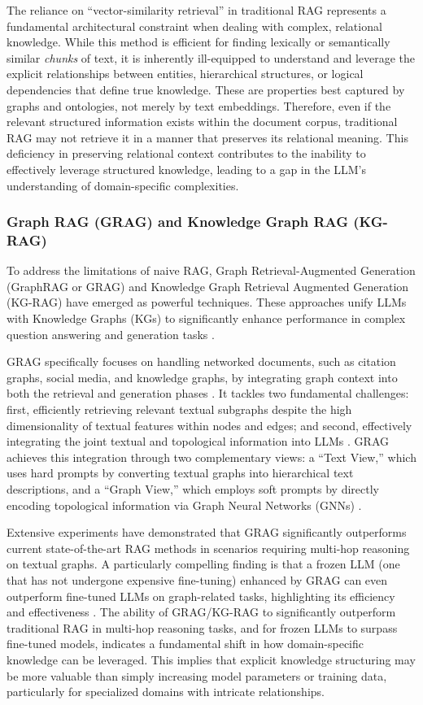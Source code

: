 \documentclass[12pt]{article}
\let\cite\textcite  %
\begin{document}
The reliance on ``vector-similarity retrieval'' in traditional RAG represents a fundamental architectural constraint when dealing with complex, relational knowledge. While this method is efficient for finding lexically or semantically similar \emph{chunks} of text, it is inherently ill-equipped to understand and leverage the explicit relationships between entities, hierarchical structures, or logical dependencies that define true knowledge. These are properties best captured by graphs and ontologies, not merely by text embeddings. Therefore, even if the relevant structured information exists within the document corpus, traditional RAG may not retrieve it in a manner that preserves its relational meaning. This deficiency in preserving relational context contributes to the inability to effectively leverage structured knowledge, leading to a gap in the LLM's understanding of domain-specific complexities.

\subsubsection{Graph RAG (GRAG) and Knowledge Graph RAG (KG-RAG)}

To address the limitations of naive RAG, Graph Retrieval-Augmented Generation (GraphRAG or GRAG) and Knowledge Graph Retrieval Augmented Generation (KG-RAG) have emerged as powerful techniques. These approaches unify LLMs with Knowledge Graphs (KGs) to significantly enhance performance in complex question answering and generation tasks \cite{googleai2023rag, chen2024og}.

GRAG specifically focuses on handling networked documents, such as citation graphs, social media, and knowledge graphs, by integrating graph context into both the retrieval and generation phases \cite{datacamp2024kg}. It tackles two fundamental challenges: first, efficiently retrieving relevant textual subgraphs despite the high dimensionality of textual features within nodes and edges; and second, effectively integrating the joint textual and topological information into LLMs \cite{datacamp2024kg}. GRAG achieves this integration through two complementary views: a ``Text View,'' which uses hard prompts by converting textual graphs into hierarchical text descriptions, and a ``Graph View,'' which employs soft prompts by directly encoding topological information via Graph Neural Networks (GNNs) \cite{datacamp2024kg}.

Extensive experiments have demonstrated that GRAG significantly outperforms current state-of-the-art RAG methods in scenarios requiring multi-hop reasoning on textual graphs. A particularly compelling finding is that a frozen LLM (one that has not undergone expensive fine-tuning) enhanced by GRAG can even outperform fine-tuned LLMs on graph-related tasks, highlighting its efficiency and effectiveness \cite{datacamp2024kg}. The ability of GRAG/KG-RAG to significantly outperform traditional RAG in multi-hop reasoning tasks, and for frozen LLMs to surpass fine-tuned models, indicates a fundamental shift in how domain-specific knowledge can be leveraged. This implies that explicit knowledge structuring may be more valuable than simply increasing model parameters or training data, particularly for specialized domains with intricate relationships.
\end{document}
